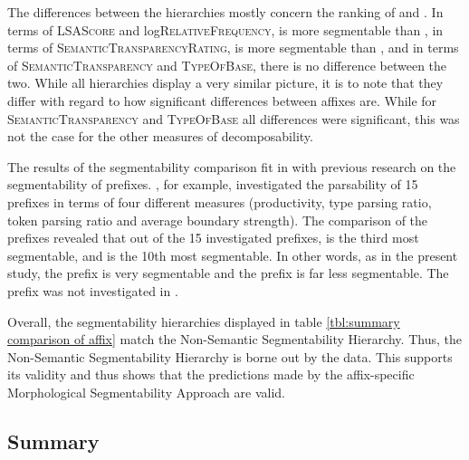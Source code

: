 The differences  between the hierarchies mostly concern the ranking of  and . In terms of \textsc{LSAScore} and log\textsc{RelativeFrequency},  is more segmentable than , in terms of \textsc{SemanticTransparencyRating},  is more segmentable than , and in terms of \textsc{SemanticTransparency} and \textsc{TypeOfBase}, there is no difference between the two. 
While all hierarchies display a very similar picture, it is to note that they differ with regard to how significant differences between affixes are. While for \textsc{SemanticTransparency} and \textsc{TypeOfBase} all differences were significant, this was not the case for the other measures of decomposability. 


The results of the segmentability comparison fit in with previous research on the segmentability of prefixes. \cite{Zirkel.2010}, for example, investigated the parsability of 15 prefixes in terms of four different measures (productivity, type parsing ratio, token parsing ratio and average boundary strength). The comparison of the prefixes revealed that out of the 15 investigated prefixes,  is the third most segmentable, and  is the 10th most segmentable. In other words, as in the present study, the prefix  is very segmentable and the prefix  is far less segmentable. The prefix  was not investigated in \cite{Zirkel.2010}. 

Overall, the segmentability hierarchies displayed in table \ref{tbl:summary comparison of affix} match the Non-Semantic Segmentability Hierarchy. Thus, the Non-Semantic Segmentability Hierarchy is borne out by the data. This supports its validity and thus shows that the predictions made by the affix-specific Morphological Segmentability Approach are valid.

\subsection{Summary } \label{summary decomposability corpus study}

